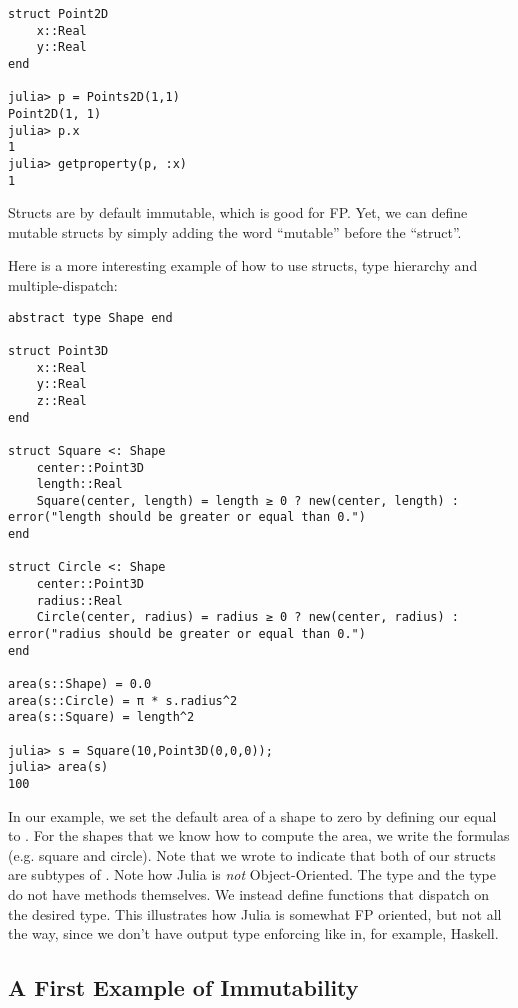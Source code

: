 \begin{lstlisting}[language=JuliaLocal, style=julia, texcl=true]
struct Point2D
    x::Real
    y::Real
end

julia> p = Points2D(1,1)
Point2D(1, 1)
julia> p.x
1
julia> getproperty(p, :x)
1
\end{lstlisting}

Structs are by default immutable, which is good for FP. Yet, we can define mutable structs by simply
adding the word ``mutable'' before the ``struct''.

Here is a more interesting example of how to use structs, type hierarchy and multiple-dispatch:

\begin{lstlisting}[language=JuliaLocal, style=julia, texcl=true]
abstract type Shape end

struct Point3D
    x::Real
    y::Real
    z::Real
end

struct Square <: Shape
    center::Point3D
    length::Real
    Square(center, length) = length ≥ 0 ? new(center, length) : error("length should be greater or equal than 0.")
end

struct Circle <: Shape
    center::Point3D
    radius::Real
    Circle(center, radius) = radius ≥ 0 ? new(center, radius) : error("radius should be greater or equal than 0.")
end

area(s::Shape) = 0.0
area(s::Circle) = π * s.radius^2
area(s::Square) = length^2

julia> s = Square(10,Point3D(0,0,0));
julia> area(s)
100
\end{lstlisting}
In our example, we set the default area of a shape to zero by defining our  equal
to . For the
shapes that we know how to compute the area, we write the formulas (e.g. square and circle). Note that
we wrote  to indicate that both of our structs are subtypes of .
Note how Julia is \textit{not} Object-Oriented. The type  and the type 
do not have methods themselves. We instead define functions that dispatch on the desired type.
This illustrates how Julia is somewhat FP oriented, but not all the way, since we don't have
output type enforcing like in, for example, Haskell.


\subsection{A First Example of Immutability}

